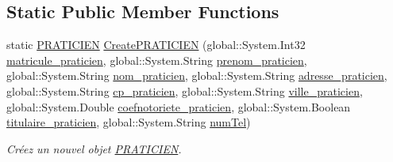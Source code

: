 \subsection*{Static Public Member Functions}
\begin{DoxyCompactItemize}
\item 
static \hyperlink{class_model_1_1_p_r_a_t_i_c_i_e_n}{P\-R\-A\-T\-I\-C\-I\-E\-N} \hyperlink{class_model_1_1_p_r_a_t_i_c_i_e_n_acd3d36c30b2afe182c8977a6307379ac}{Create\-P\-R\-A\-T\-I\-C\-I\-E\-N} (global\-::\-System.\-Int32 \hyperlink{class_model_1_1_p_r_a_t_i_c_i_e_n_abe4fab1270371ef15fc1342a8d048d26}{matricule\-\_\-praticien}, global\-::\-System.\-String \hyperlink{class_model_1_1_p_r_a_t_i_c_i_e_n_a2fa0f78d1573fe2d7d39d0a18feced05}{prenom\-\_\-praticien}, global\-::\-System.\-String \hyperlink{class_model_1_1_p_r_a_t_i_c_i_e_n_aebc5f079e73aca7fde020d817a1be78d}{nom\-\_\-praticien}, global\-::\-System.\-String \hyperlink{class_model_1_1_p_r_a_t_i_c_i_e_n_af65b1cb99d1ba84d1f1a3c9d4ff96637}{adresse\-\_\-praticien}, global\-::\-System.\-String \hyperlink{class_model_1_1_p_r_a_t_i_c_i_e_n_a2a75459147811d5a57c500054d647925}{cp\-\_\-praticien}, global\-::\-System.\-String \hyperlink{class_model_1_1_p_r_a_t_i_c_i_e_n_ae32f7c05fd2519a7a0b308ba1117856a}{ville\-\_\-praticien}, global\-::\-System.\-Double \hyperlink{class_model_1_1_p_r_a_t_i_c_i_e_n_af7a6f895c280db516f12fdf90e207bae}{coefnotoriete\-\_\-praticien}, global\-::\-System.\-Boolean \hyperlink{class_model_1_1_p_r_a_t_i_c_i_e_n_aab525a0862d5b0b441b850563c7f2a69}{titulaire\-\_\-praticien}, global\-::\-System.\-String \hyperlink{class_model_1_1_p_r_a_t_i_c_i_e_n_a3182fceec324d9beb52831dd2f36af6f}{num\-Tel})
\begin{DoxyCompactList}\small\item\em Créez un nouvel objet \hyperlink{class_model_1_1_p_r_a_t_i_c_i_e_n}{P\-R\-A\-T\-I\-C\-I\-E\-N}. \end{DoxyCompactList}\end{DoxyCompactItemize}
